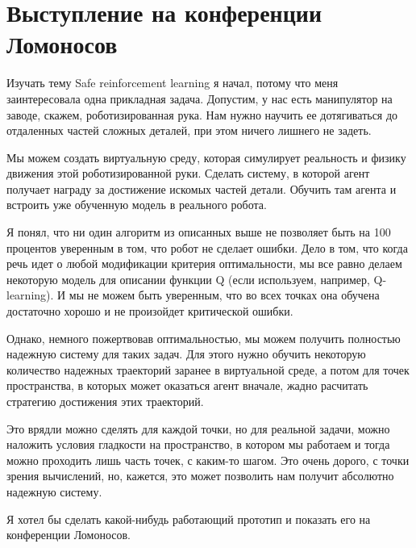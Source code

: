 \documentclass[a4paper]{article}
\begin{document}
\section{Выступление на конференции Ломоносов}
Изучать тему Safe reinforcement learning я начал, потому что меня заинтересовала одна прикладная задача. Допустим, у нас есть манипулятор на заводе, скажем, роботизированная рука. Нам нужно научить ее дотягиваться до отдаленных частей сложных деталей, при этом ничего лишнего не задеть.

Мы можем создать виртуальную среду, которая симулирует реальность и физику движения этой роботизированной руки. Сделать систему, в которой агент получает награду за достижение искомых частей детали.
Обучить там агента и встроить уже обученную модель в реального робота.


Я понял, что ни один алгоритм из описанных выше не позволяет быть на 100 процентов уверенным в том, что робот не сделает ошибки.
Дело в том, что когда речь идет о любой модификации критерия оптимальности, мы все равно делаем некоторую модель для описании функции Q (если используем, например, Q-learning). И мы не можем быть уверенным, что во всех точках она обучена достаточно хорошо и не произойдет критической ошибки.

Однако, немного пожертвовав оптимальностью, мы можем получить полностью надежную систему для таких задач. 
Для этого нужно обучить некоторую количество надежных траекторий заранее в виртуальной среде, а потом для точек пространства, в которых может оказаться агент вначале, жадно расчитать стратегию достижения этих траекторий.

Это врядли можно сделять для каждой точки, но для реальной задачи, можно наложить условия гладкости на пространство, в котором мы работаем и тогда можно проходить лишь часть точек, с каким-то шагом. Это очень дорого, с точки зрения вычислений, но, кажется, это может позволить нам получит абсолютно надежную систему.

Я хотел бы сделать какой-нибудь работающий прототип и показать его на конференции Ломоносов.
\end{document}
